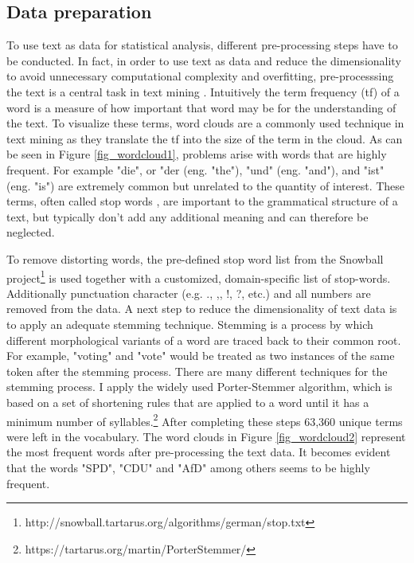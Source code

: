 \documentclass[12pt,a4paper,notitlepage]{article}
\begin{document}
\subsection{Data preparation}

To use text as data for statistical analysis, different pre-processing steps have to be conducted. In fact, in order to use text as data and reduce the dimensionality to avoid unnecessary computational complexity and overfitting, pre-processsing the text is a central task in text mining \citep{gentzkow_text_2017, bholat_text_2015}. Intuitively the term frequency (tf) of a word is a measure of how important that word may be for the understanding of the text. To visualize these terms, word clouds are a commonly used technique in text mining as they translate the tf into the size of the term in the cloud. As can be seen in Figure \ref{fig_wordcloud1}, problems arise with words that are highly frequent. For example "die", or "der (eng. "the"), "und" (eng. "and"), and "ist" (eng. "is") are extremely common but unrelated to the quantity of interest. These terms, often called stop words \citep{gentzkow_text_2017}, are important to the grammatical structure of a text, but typically don't add any additional meaning and can therefore be neglected. 

To remove distorting words, the pre-defined stop word list from the Snowball project\footnote{http://snowball.tartarus.org/algorithms/german/stop.txt} is used together with a customized, domain-specific list of stop-words. Additionally punctuation character (e.g. ., ,, !, ?, etc.) and all numbers are removed from the data. A next step to reduce the dimensionality of text data is to apply an adequate stemming technique. Stemming is a process by which different morphological variants of a word are traced back to their common root. For example, "voting" and "vote" would be treated as two instances of the same token after the stemming process. There are many different techniques for the stemming process. I apply the widely used Porter-Stemmer algorithm, which is based on a set of shortening rules that are applied to a word until it has a minimum number of syllables.\footnote{https://tartarus.org/martin/PorterStemmer/} After completing these steps 63,360 unique terms were left in the vocabulary. The word clouds in Figure \ref{fig_wordcloud2} represent the most frequent words after pre-processing the text data. It becomes evident that the words "SPD", "CDU" and "AfD" among others seems to be highly frequent.  
\end{document}

